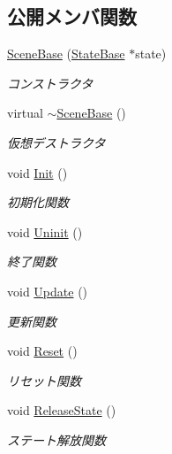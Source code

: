 \subsection*{公開メンバ関数}
\begin{DoxyCompactItemize}
\item 
\mbox{\hyperlink{class_scene_base_aeafd60485ad8b2191f40da3013d50f2c}{Scene\+Base}} (\mbox{\hyperlink{class_scene_base_1_1_state_base}{State\+Base}} $\ast$state)
\begin{DoxyCompactList}\small\item\em コンストラクタ \end{DoxyCompactList}\item 
virtual \mbox{\hyperlink{class_scene_base_a187dd160e5a16909bcc6529851e38318}{$\sim$\+Scene\+Base}} ()
\begin{DoxyCompactList}\small\item\em 仮想デストラクタ \end{DoxyCompactList}\item 
void \mbox{\hyperlink{class_scene_base_a494ba624fdd95b296e4487ed1a34f47b}{Init}} ()
\begin{DoxyCompactList}\small\item\em 初期化関数 \end{DoxyCompactList}\item 
void \mbox{\hyperlink{class_scene_base_aa4babf42cf2c2b6e17bb3ddd6ff13d31}{Uninit}} ()
\begin{DoxyCompactList}\small\item\em 終了関数 \end{DoxyCompactList}\item 
void \mbox{\hyperlink{class_scene_base_a71f332a32d99548b3aa912210a2dd0b0}{Update}} ()
\begin{DoxyCompactList}\small\item\em 更新関数 \end{DoxyCompactList}\item 
void \mbox{\hyperlink{class_scene_base_ae2dc09554ec21ffe231fa73a6cdd7ca1}{Reset}} ()
\begin{DoxyCompactList}\small\item\em リセット関数 \end{DoxyCompactList}\item 
void \mbox{\hyperlink{class_scene_base_aaa1e66fbfc6740b069d715b325915b97}{Release\+State}} ()
\begin{DoxyCompactList}\small\item\em ステート解放関数 \end{DoxyCompactList}\item 

\end{DoxyCompactItemize}
